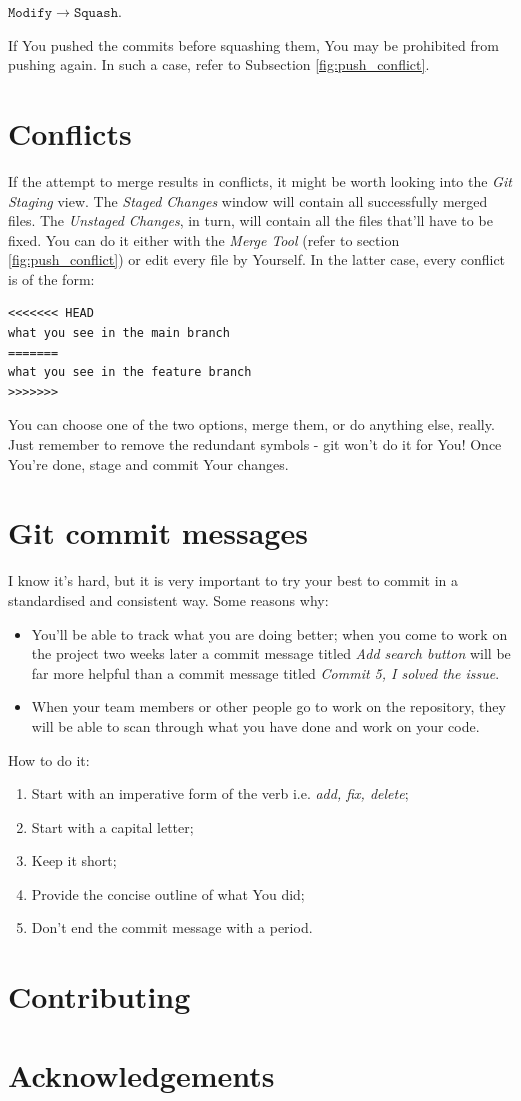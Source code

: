 \documentclass{article}
\begin{document}
$\mathtt{Modify\rightarrow Squash}$.\newline

If You pushed the commits before squashing them, You may be prohibited from pushing again. In such a case, refer to Subsection \ref{fig:push_conflict}.

\section{Conflicts}
\label{sec:conflicts}

If the attempt to merge results in conflicts, it might be worth looking into the \textit{Git Staging} view. The \textit{Staged Changes} window will contain all successfully merged files. The \textit{Unstaged Changes}, in turn, will contain all the files that'll have to be fixed. You can do it either with the \textit{Merge Tool} (refer to section \ref{fig:push_conflict}) or edit every file by Yourself. In the latter case, every conflict is of the form:
\begin{verbatim}
<<<<<<< HEAD
what you see in the main branch
=======
what you see in the feature branch
>>>>>>>
\end{verbatim}
You can choose one of the two options, merge them, or do anything else, really. Just remember to remove the redundant symbols - git won't do it for You! Once You're done, stage and commit Your changes.


\section{Git commit messages}
\label{sec:commit_messages}
I know it's hard, but it is very important to try your best to commit in a standardised and consistent way. Some reasons why: 
\begin{itemize}
    \item You'll be able to track what you are doing better; when you come to work on the project two weeks later a commit message titled \textit{Add search button} will be far more helpful than a commit message titled \textit{Commit 5, I solved the issue}.
    \item When your team members or other people go to work on the repository, they will be able to scan through what you have done and work on your code. 
\end{itemize}

How to do it: 
\begin{enumerate}
    \item Start with an imperative form of the verb i.e. \textit{add, fix, delete};
    \item Start with a capital letter; 
    \item Keep it short;
    \item Provide the concise outline of what You did;
    \item Don't end the commit message with a period. 
\end{enumerate}

\section{Contributing}
\label{sec:contributing}

\section{Acknowledgements}
\end{document}
